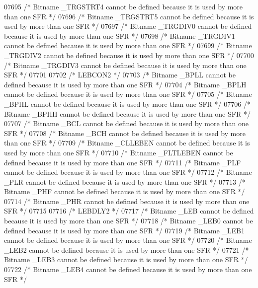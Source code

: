\begin{DoxyCode}
07695 \textcolor{comment}{/* Bitname \_TRGSTRT4 cannot be defined because it is used by more than one SFR */}
07696 \textcolor{comment}{/* Bitname \_TRGSTRT5 cannot be defined because it is used by more than one SFR */}
07697 \textcolor{comment}{/* Bitname \_TRGDIV0 cannot be defined because it is used by more than one SFR */}
07698 \textcolor{comment}{/* Bitname \_TRGDIV1 cannot be defined because it is used by more than one SFR */}
07699 \textcolor{comment}{/* Bitname \_TRGDIV2 cannot be defined because it is used by more than one SFR */}
07700 \textcolor{comment}{/* Bitname \_TRGDIV3 cannot be defined because it is used by more than one SFR */}
07701 
07702 \textcolor{comment}{/* LEBCON2 */}
07703 \textcolor{comment}{/* Bitname \_BPLL cannot be defined because it is used by more than one SFR */}
07704 \textcolor{comment}{/* Bitname \_BPLH cannot be defined because it is used by more than one SFR */}
07705 \textcolor{comment}{/* Bitname \_BPHL cannot be defined because it is used by more than one SFR */}
07706 \textcolor{comment}{/* Bitname \_BPHH cannot be defined because it is used by more than one SFR */}
07707 \textcolor{comment}{/* Bitname \_BCL cannot be defined because it is used by more than one SFR */}
07708 \textcolor{comment}{/* Bitname \_BCH cannot be defined because it is used by more than one SFR */}
07709 \textcolor{comment}{/* Bitname \_CLLEBEN cannot be defined because it is used by more than one SFR */}
07710 \textcolor{comment}{/* Bitname \_FLTLEBEN cannot be defined because it is used by more than one SFR */}
07711 \textcolor{comment}{/* Bitname \_PLF cannot be defined because it is used by more than one SFR */}
07712 \textcolor{comment}{/* Bitname \_PLR cannot be defined because it is used by more than one SFR */}
07713 \textcolor{comment}{/* Bitname \_PHF cannot be defined because it is used by more than one SFR */}
07714 \textcolor{comment}{/* Bitname \_PHR cannot be defined because it is used by more than one SFR */}
07715 
07716 \textcolor{comment}{/* LEBDLY2 */}
07717 \textcolor{comment}{/* Bitname \_LEB cannot be defined because it is used by more than one SFR */}
07718 \textcolor{comment}{/* Bitname \_LEB0 cannot be defined because it is used by more than one SFR */}
07719 \textcolor{comment}{/* Bitname \_LEB1 cannot be defined because it is used by more than one SFR */}
07720 \textcolor{comment}{/* Bitname \_LEB2 cannot be defined because it is used by more than one SFR */}
07721 \textcolor{comment}{/* Bitname \_LEB3 cannot be defined because it is used by more than one SFR */}
07722 \textcolor{comment}{/* Bitname \_LEB4 cannot be defined because it is used by more than one SFR */}

\end{DoxyCode}
